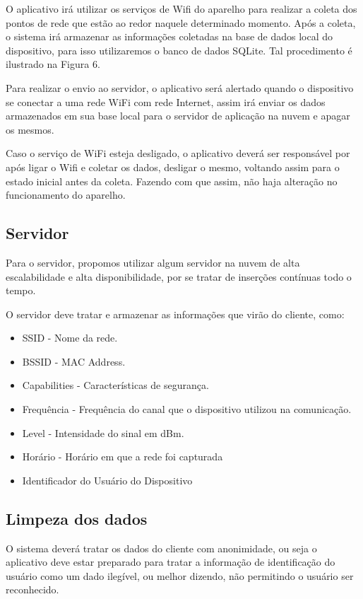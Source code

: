 \documentclass[12pt, %
openright, 
oneside,
a4paper,
brazil]{facom-ufu-abntex2}
\begin{document}
O aplicativo irá utilizar os serviços de Wifi 	 do aparelho para realizar a coleta dos pontos de rede que estão ao redor naquele determinado momento. Após a coleta, o sistema irá armazenar as informações coletadas na base de dados local do 	dispositivo, para isso utilizaremos o banco de dados SQLite. Tal procedimento é ilustrado na Figura 6.

Para realizar o envio ao servidor, o aplicativo será alertado quando o dispositivo se conectar a uma rede WiFi com rede Internet, assim irá enviar os dados armazenados em sua base local para o servidor de aplicação na nuvem e apagar os mesmos. 

Caso o serviço de WiFi esteja desligado, o aplicativo deverá ser responsável por após ligar o Wifi e coletar os dados, desligar o mesmo, voltando assim para o estado inicial antes da coleta. Fazendo com que assim, não haja alteração no funcionamento do aparelho.




\subsection{Servidor}
Para o servidor, propomos utilizar algum servidor na nuvem de alta escalabilidade e alta disponibilidade, por se tratar de inserções contínuas todo o tempo.

O servidor deve tratar e  armazenar as informações que virão do cliente, como:
\begin{itemize}
  \item \ac{SSID} - Nome da rede.
  \item  \ac{BSSID} - MAC Address. 
  \item Capabilities - Características de segurança. 
  \item Frequência - Frequência do canal que o dispositivo utilizou na comunicação.
  \item Level - Intensidade do sinal em dBm.
  \item Horário - Horário em que a rede foi capturada
  \item Identificador do Usuário do Dispositivo
  \end{itemize}
  
\subsection{Limpeza dos dados}
O sistema deverá tratar os dados do cliente com anonimidade, ou seja o aplicativo deve estar preparado para tratar a informação de identificação do usuário como um dado ilegível, ou melhor dizendo, não permitindo o usuário ser reconhecido. 
\end{document}
